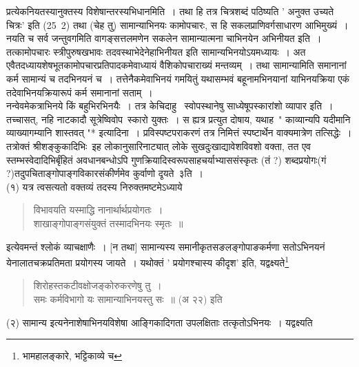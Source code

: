 \documentclass[11pt, openany]{book}
\begin{document}
\noindent
प्रत्येकनियतस्यानुक्तस्य विशेषान्तरस्यभिधानमिति~। तथा हि तत्र चित्रशब्दं पठिष्यति ' अनुक्त उच्यते चित्रः' इति (25\textendash\ 2) तथा (चेह तु) सामान्याभिनयः कामोपचारः, स हि सकलप्राणिवर्गसाधारण आभिमुख्यं~। नयति च सर्व जन्तुवगमिति वागङ्सत्तलमणेन सकलेन सामान्यात्मना चाभिनयेन अभिनीयत इति~। तत्कामोपचारः स्त्रीपुरुषखभावः तदवस्थाभेदेनेहाभिनीयत इति सामान्यभिनयोऽयमध्यायः~। अत एवैतदध्यायशेषभूतकामोपचारप्रतिपादकमेवाध्यायं वैशिकोपचाराख्यं मन्तव्यम्~। तथा सामान्यामिति समानानां कर्म सामान्यं च तदभिनयनं च~। तत्तेनैकमेवाभिनयं गमयितुं यथासम्भवं बहूनामभिनयानां याभिनयक्रिया एकं तदेवाभिनयक्रियारूपं कर्म समानानां सताम्~। \\

नन्वेवमेकत्राभिनये किं बहुभिरभिनयैः~। तत्र केचिदाहु \textendash\ स्वोपस्थानेषु साध्येषूपस्कारांशो व्यापार इति~। तच्चासत्, नहि नाटकादौ सूत्रेष्विवोप\textendash\ स्कारो युक्तः~। स ह्यत्र प्रत्युत दोषाय, यथाह\textendash\ " काव्यान्यपि यदीमानि व्याख्यागम्यानि शास्तवत् "* इत्यादिना~। प्रविस्पष्टपराकरणं तत्र निमित्तं स्पष्टार्थेन वाक्यमात्रेण तत्सिद्धेः~।\\ 

तत्रोक्तं श्रीशङ्कुकादिभिः\textendash\ इह लोकानुसारिनाट्यात् लोके सुखदुःखाद्यावेशविवशो वक्ता, तत एव स्तम्भस्वेदादिभिर्बृंहितं अवधानबन्धोऽपि गुणक्रियादिस्वरूपसाहचर्याभ्याससंस्कृतः (तं ?) शब्दप्रयोगः(गं ?)तदुपचिताङ्गोपाङ्गविकारसंकीर्णमेव कुर्वाणो दृ्यते\textendash\ ३ति~। \\

(१) यत्र त्वसत्यतो वक्तव्यं तदस्य निरुक्तमष्टमेऽध्याये \textendash\ 

\begin{quote}
{\qt विभावयति यस्माद्धि नानार्थार्थप्रयोगतः~। \\
शाखाङ्गोपाङ्गसंयुक्तं तस्मादभिनयः स्मृतः~॥ }
\end{quote}

इत्येवमन्तं श्लोकं व्याचक्षाणैः~। [न तथा] सामान्यस्य समानीकृतसङलङ्गोपाङकर्मणा सतोऽभिनयनं येनालातचक्रप्रतिमता प्रयोगस्य जायते~। यथोक्तं ' प्रयोगश्चास्य कीदृश' इति, यद्वक्ष्यते\renewcommand{\thefootnote}{*}\footnote{भामहालङ्कारे, भट्टिकाव्ये च}

\newpage

\begin{quote}
{\qt शिरोहस्तकटीवक्षोजङ्कोरुकरणेषु तु~। \\
 समः कर्मविभागो यः सामान्याभिनयस्तु सः~॥} (अ २२) इति
\end{quote}

(२) सामान्य इत्यनेनाशेषाभिनयविशेषा आङ्गिकादिगता उपलक्षिताः तत्कृतोऽभिनयः~। यद्वक्ष्यति\textendash
\end{document}
